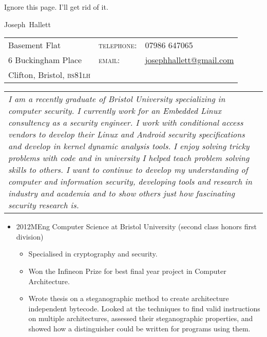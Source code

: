 \documentclass{book}
\newcommand{\lowercaps}[1]{\textsc{\MakeLowercase{#1}}}
\newcommand{\heading}[1]{{{\color{BrickRed}\hspace{1em}\Huge #1}\vspace{0.5em}}}
\newcommand{\sideheading}[1]{\vspace{0.5em}\marginnote[\color{BrickRed}\raggedleft\lowercaps{#1}]{\raggedleft\lowercaps{#1}}}
\newcommand{\email}[1]{\href{mailto:#1}{#1}}
\newcommand{\postcode}[1]{\lowercaps{#1}}
\newcommand{\listhead}[1]{#1}
\begin{document}
Ignore this page.  I'll get rid of it.
\newpage

\heading{Joseph~Hallett}

\begin{tabular}{l@{\hspace{12em}} l@{\hspace{1em}} l}
Basement Flat & \textsc{telephone:} & 07986 647065 \\
6 Buckingham Place & \textsc{email:} & \email{josephhallett@gmail.com} \\
Clifton, Bristol, \postcode{bs81lh} & &  \\
\end{tabular}

\vspace{2em}
\begin{tabular}{p{\textwidth}}\itshape
	I am a recently graduate of Bristol University specializing in computer
	security.  I currently work for an Embedded Linux consultency as a
	security engineer.  I work with conditional access vendors to develop
	their Linux and Android security specifications and develop in kernel
	dynamic analysis tools.  I enjoy solving tricky problems with code and
	in university I helped teach problem solving skills to others.  I want
	to continue to develop my understanding of computer and information
	security, developing tools and research in industry and academia and to
	show others just how fascinating security research is.
\end{tabular}
\vspace{0.5em}

\begin{itemize}
   \item 
     \sideheading{Education}%
     \listhead{2012\hspace{1em}MEng Computer Science at Bristol University (second class honors first division)}
     \begin{itemize}
       \item[] Specialised in cryptography and security.
       \item[] Won the Infineon Prize for best final year project in Computer Architecture.
       \item[] Wrote thesis on a steganographic method to create architecture independent bytecode.
       Looked at the techniques to find valid instructions on multiple
       architectures, assessed their steganographic properties, and showed how
       a distinguisher could be written for programs using them.
     \end{itemize}
\end{itemize}
 
\end{document}
